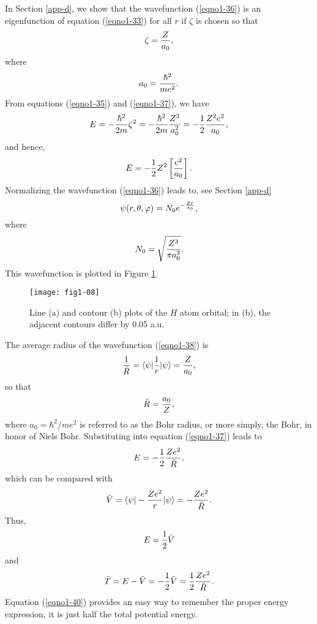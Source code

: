 In Section \ref{app-d}, we show that the wavefunction (\ref{eqno1-36})
is an eigenfunction of equation (\ref{eqno1-33}) for all $r$ if
$\zeta$ is chosen so that
\begin{equation}
\zeta = {Z \over a_0},
\label{eqno1-37}
\end{equation}
where
\begin{equation}
a_0 = {\hbar^2 \over me^2}.
\label{eqno1-38}
\end{equation}
From equations (\ref{eqno1-35}) and (\ref{eqno1-37}), we have
\begin{equation}
E = - {\hbar^2 \over 2m} \zeta^2 = - {\hbar^2 \over 2m} {Z^2 \over 
a_0^2} = - {1 \over 2} {Z^2e^2 \over a_0},
\end{equation}
and hence,
\begin{equation}
E = - {1 \over 2} Z^2 \left[ {e^2 \over a_0} \right].
\label{eqno1-39a}
\end{equation}
Normalizing the wavefunction (\ref{eqno1-36}) leads to, see Section
\ref{app-d}
\begin{equation}
\psi ( r , \theta, \varphi ) = N_0 e^{-{Zr \over a_0}},
\label{eqno1-39b}
\end{equation}
where
\begin{equation}
N_0 = \sqrt{{Z^3 \over \pi a_0^3}}.
\end{equation}
This wavefunction is plotted in Figure \ref{fig1-8}.

\begin{figure}
\texttt{[image: fig1-08]}
\caption{Line (a) and contour (b) plots of the $H$ atom orbital; in
(b), the adjacent contours differ by 0.05 a.u.}
\label{fig1-8}
\end{figure}

The average radius of the wavefunction (\ref{eqno1-38}) is
\begin{equation}
{1 \over \bar{R}} = \langle \psi \vert {1 \over r} \vert \psi \rangle = {Z 
\over a_0},
\end{equation}
so that
\begin{equation}
{\bar R} = {a_0 \over Z},
\end{equation}
where $a_0 = \hbar^2/me^2$ is referred to as the Bohr radius, or more
simply, the Bohr, in honor of Niels Bohr. Substituting into equation
(\ref{eqno1-37}) leads to
\begin{equation}
E = - {1 \over 2} {Ze^2 \over {\bar R}} ,
\label{eqno1-40}
\end{equation}
which can be compared with
\begin{equation}
{\bar V} = \langle \psi \vert - {Ze^2 \over r} \vert \psi \rangle 
= -{Ze^2 \over {\bar R}}.
\end{equation}
Thus,
\begin{equation}
E = {1 \over 2} {\bar V}
\end{equation}
and
\begin{equation}
{\bar T} = E - {\bar V} = - {1 \over 2} {\bar V} = {1 \over 2} {Ze^2 
\over {\bar R}}.
\end{equation}
Equation (\ref{eqno1-40}) provides an easy way to remember the proper
energy expression, it is just half the total potential energy.

